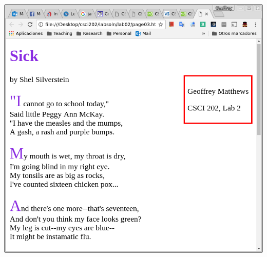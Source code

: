 \documentclass{article}
\begin{document}
\begin{description}
  {\includegraphics[scale=0.5]{sick.png}}




\end{description}
\end{document}
